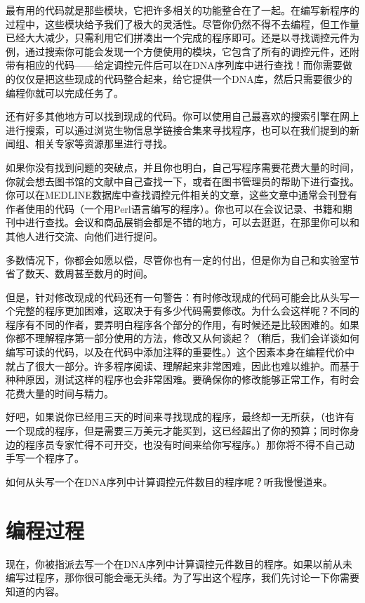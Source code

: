 最有用的代码就是那些模块，它把许多相关的功能整合在了一起。在编写新程序的过程中，这些模块给予我们了极大的灵活性。尽管你仍然不得不去编程，但工作量已经大大减少，只需利用它们拼凑出一个完成的程序即可。还是以寻找调控元件为例，通过搜索你可能会发现一个方便使用的模块，它包含了所有的调控元件，还附带有相应的代码——给定调控元件后可以在DNA序列库中进行查找！而你需要做的仅仅是把这些现成的代码整合起来，给它提供一个DNA库，然后只需要很少的编程你就可以完成任务了。

还有好多其他地方可以找到现成的代码。你可以使用自己最喜欢的搜索引擎在网上进行搜索，可以通过浏览生物信息学链接合集来寻找程序，也可以在我们提到的新闻组、相关专家等资源那里进行寻找。

如果你没有找到问题的突破点，并且你也明白，自己写程序需要花费大量的时间，你就会想去图书馆的文献中自己查找一下，或者在图书管理员的帮助下进行查找。你可以在MEDLINE数据库中查找调控元件相关的文章，这些文章中通常会刊登有作者使用的代码（一个用Perl语言编写的程序）。你也可以在会议记录、书籍和期刊中进行查找。会议和商品展销会都是不错的地方，可以去逛逛，在那里你可以和其他人进行交流、向他们进行提问。

多数情况下，你都会如愿以偿，尽管你也有一定的付出，但是你为自己和实验室节省了数天、数周甚至数月的时间。

但是，针对修改现成的代码还有一句警告：有时修改现成的代码可能会比从头写一个完整的程序更加困难，这取决于有多少代码需要修改。为什么会这样呢？不同的程序有不同的作者，要弄明白程序各个部分的作用，有时候还是比较困难的。如果你都不理解程序第一部分使用的方法，修改又从何谈起？（稍后，我们会详谈如何编写可读的代码，以及在代码中添加注释的重要性。）这个因素本身在编程代价中就占了很大一部分。许多程序阅读、理解起来非常困难，因此也难以维护。而基于种种原因，测试这样的程序也会非常困难。要确保你的修改能够正常工作，有时会花费大量的时间与精力。

好吧，如果说你已经用三天的时间来寻找现成的程序，最终却一无所获，（也许有一个现成的程序，但是需要三万美元才能买到，这已经超出了你的预算；同时你身边的程序员专家忙得不可开交，也没有时间来给你写程序。）那你将不得不自己动手写一个程序了。

如何从头写一个在DNA序列中计算调控元件数目的程序呢？听我慢慢道来。

\section{编程过程}
现在，你被指派去写一个在DNA序列中计算调控元件数目的程序。如果以前从未编写过程序，那你很可能会毫无头绪。为了写出这个程序，我们先讨论一下你需要知道的内容。

